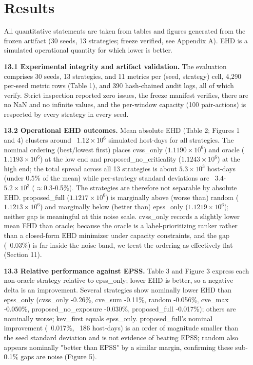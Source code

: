 \section{Results}

All quantitative statements are taken from tables and figures generated from the
frozen artifact (30 seeds, 13 strategies; freeze verified, see Appendix A). EHD is
a simulated operational quantity for which lower is better.

\textbf{13.1 Experimental integrity and artifact validation.} The evaluation comprises
30 seeds, 13 strategies, and 11 metrics per (seed, strategy) cell, 4,290 per-seed
metric rows (Table 1), and 390 hash-chained audit logs, all of which verify.
Strict inspection reported zero issues, the freeze manifest verifies, there are no
NaN and no infinite values, and the per-window capacity (100 pair-actions) is
respected by every strategy in every seed.

\textbf{13.2 Operational EHD outcomes.} Mean absolute EHD (Table 2; Figures 1 and 4)
clusters around ~$1.12 \times 10^{6}$ simulated host-days for all strategies. The nominal
ordering (best/lowest first) places cvss\_only ($1.1190 \times 10^{6}$) and oracle
($1.1193 \times 10^{6}$) at the low end and proposed\_no\_criticality ($1.1243 \times 10^{6}$) at the
high end; the total spread across all 13 strategies is about $5.3 \times 10^{3}$ host-days
(under 0.5\% of the mean) while per-strategy standard deviations are ~3.4-$5.2 \times 10^{3}$
($\approx$0.3-0.5\%). The strategies are therefore not separable by absolute EHD.
proposed\_full ($1.1217 \times 10^{6}$) is marginally above (worse than) random
($1.1213 \times 10^{6}$) and marginally below (better than) epss\_only ($1.1219 \times 10^{6}$); neither
gap is meaningful at this noise scale. cvss\_only records a slightly lower mean EHD
than oracle; because the oracle is a label-prioritizing ranker rather than a
closed-form EHD minimizer under capacity constraints, and the gap (~0.03\%) is far
inside the noise band, we treat the ordering as effectively flat (Section 11).

\textbf{13.3 Relative performance against EPSS.} Table 3 and Figure 3 express each
non-oracle strategy relative to epss\_only; lower EHD is better, so a negative delta
is an improvement. Several strategies show nominally lower EHD than epss\_only
(cvss\_only -0.26\%, cve\_sum -0.11\%, random -0.056\%, cve\_max -0.050\%,
proposed\_no\_exposure -0.030\%, proposed\_full -0.017\%); others are nominally worse;
kev\_first equals epss\_only. proposed\_full's nominal improvement (~0.017\%, ~186
host-days) is an order of magnitude smaller than the seed standard deviation and is
not evidence of beating EPSS; random also appears nominally "better than EPSS" by a
similar margin, confirming these sub-0.1\% gaps are noise (Figure 5).

